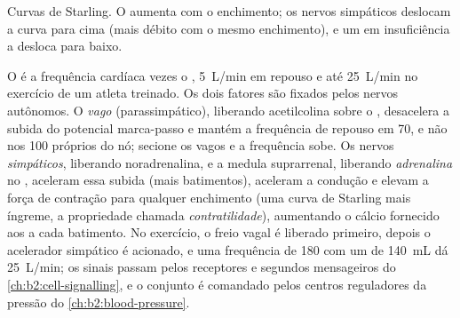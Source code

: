 \begin{omfigure}

{\small Curvas de Starling. O  aumenta com o
enchimento; os nervos simpáticos deslocam a curva para cima (mais débito
com o mesmo enchimento), e um  em insuficiência a desloca para
baixo.}
\end{omfigure}

\begin{proposition}\label{prop:b2:heart:control}
O  é a frequência cardíaca vezes o ,
\qty{5}{L/min} em repouso e até \qty{25}{L/min} no exercício de um
atleta treinado. Os dois fatores são fixados pelos nervos autônomos. O
\emph{vago} (parassimpático), liberando acetilcolina sobre o , desacelera a subida do potencial marca-passo e mantém a
frequência de repouso em 70, e não nos 100 próprios do nó; secione os
vagos e a frequência sobe. Os nervos \emph{simpáticos}, liberando
noradrenalina, e a medula suprarrenal, liberando \emph{adrenalina} no
, aceleram essa subida (mais batimentos), aceleram a condução e
elevam a força de contração para qualquer enchimento (uma curva de
Starling mais íngreme, a propriedade chamada \emph{contratilidade}),
aumentando o cálcio fornecido aos  a cada batimento. No
exercício, o freio vagal é liberado primeiro, depois o acelerador
simpático é acionado, e uma frequência de 180 com um  de
\qty{140}{mL} dá \qty{25}{L/min}; os sinais passam pelos receptores e
segundos mensageiros do \cref{ch:b2:cell-signalling}, e o conjunto é comandado pelos
centros reguladores da pressão do \cref{ch:b2:blood-pressure}.
\end{proposition}

